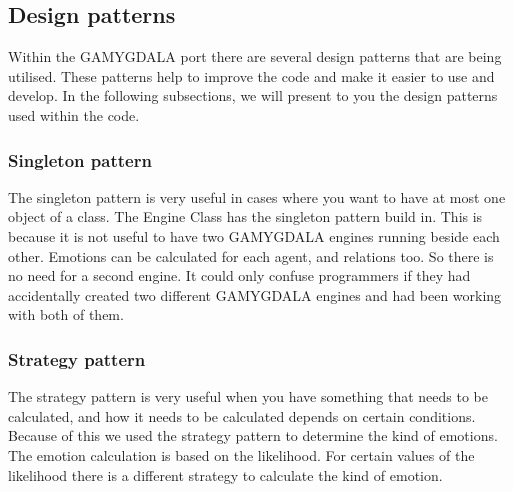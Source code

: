 \subsection{Design patterns}
Within the GAMYGDALA port there are several design patterns that are being utilised. These patterns help to improve the code and make it easier to use and develop. In the following subsections, we will present to you the design patterns used within the code.

	\subsubsection{Singleton pattern}
The singleton pattern is very useful in cases where you want to have at most one object of a class. The Engine Class has the singleton pattern build in. This is because it is not useful to have two GAMYGDALA engines running beside each other. Emotions can be calculated for each agent, and relations too. So there is no need for a second engine. It could only confuse programmers if they had accidentally created two different GAMYGDALA engines and had been working with both of them.  
  
	\subsubsection{Strategy pattern}
The strategy pattern is very useful when you have something that needs to be calculated, and how it needs to be calculated depends on certain conditions. Because of this we used the strategy pattern to determine the kind of emotions. The emotion calculation is based on the likelihood. For certain values of the likelihood there is a different strategy to calculate the kind of emotion.